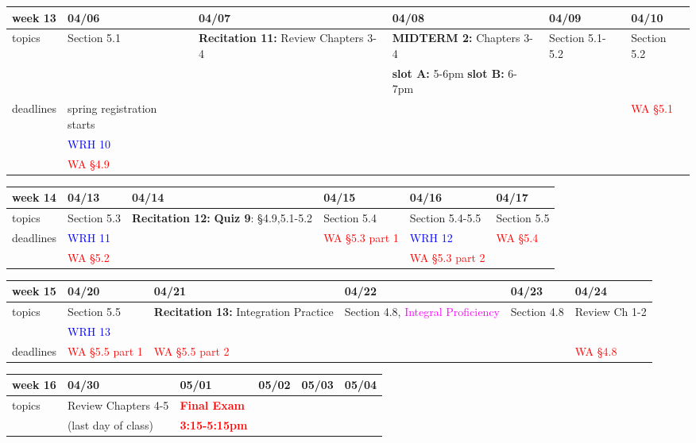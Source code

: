 \documentclass[11pt]{article}
\begin{document}
\begin{center}
\begin{tabularx}{\textwidth}{|p{1.5cm}|| L | L | L | L | L |}
\hline
week 13&04/06&04/07&04/08&04/09&04/10\\ \hline
topics &Section 5.1&\textbf{Recitation 11:} Review Chapters 3-4&\textcolor{dcyan}{\textbf{MIDTERM 2: }} Chapters 3-4&Section 5.1-5.2&Section 5.2\\ 
&&&\textcolor{ddgreen}{\textbf{slot A:} 5-6pm  \textbf{slot B:} 6-7pm}&&\\ \hline
deadlines&\textcolor{ddgreen}{spring registration starts} &&&&\textcolor{red}{WA \S 5.1} \\ 
&\textcolor{blue}{WRH 10} &&&&\\
&\textcolor{red}{WA \S 4.9}&&&& \\ \hline \end{tabularx} \end{center}

\begin{center}
\begin{tabularx}{\textwidth}{|p{1.5cm}|| L | L | L | L | L |}
\hline
week 14&04/13&04/14&04/15&04/16&04/17\\ \hline
topics &Section 5.3&\textbf{Recitation 12:}  \textbf{Quiz 9}: \S4.9,5.1-5.2&Section 5.4&Section 5.4-5.5&Section 5.5\\  \hline
deadlines&\textcolor{blue}{WRH 11} &&\textcolor{red}{WA \S 5.3 part 1}&\textcolor{blue}{WRH 12}&\textcolor{red}{WA \S 5.4} \\ 
&\textcolor{red}{WA \S 5.2}&&&\textcolor{red}{WA \S5.3 part 2}&\\ \hline \end{tabularx} \end{center}

\begin{center}
\begin{tabularx}{\textwidth}{|p{1.5cm}|| L | L | L | L | L |}
\hline
week 15&04/20&04/21&04/22&04/23&04/24\\ \hline
topics&Section 5.5&\textbf{Recitation 13:} Integration Practice &Section 4.8, \textcolor{magenta}{Integral Proficiency}&Section 4.8&Review Ch 1-2\\ \hline
&\textcolor{blue}{WRH 13}&&&&\\ 
deadlines& \textcolor{red}{WA \S 5.5 part 1}&\textcolor{red}{WA \S 5.5 part 2}&&&\textcolor{red}{WA \S 4.8} \\ \hline \end{tabularx} \end{center}

\begin{center}
\begin{tabularx}{\textwidth}{|p{1.5cm}|| L | L | L | L | L |}
\hline
week 16&04/30&05/01&05/02&05/03&05/04\\ \hline
topics&Review Chapters 4-5&\textcolor{red}{\textbf{Final Exam}} &&&\\ 
&(last day of class)&\textcolor{red}{\textbf{3:15-5:15pm}}&&&\\ \hline \hline
\end{tabularx} \end{center}
\end{document}
